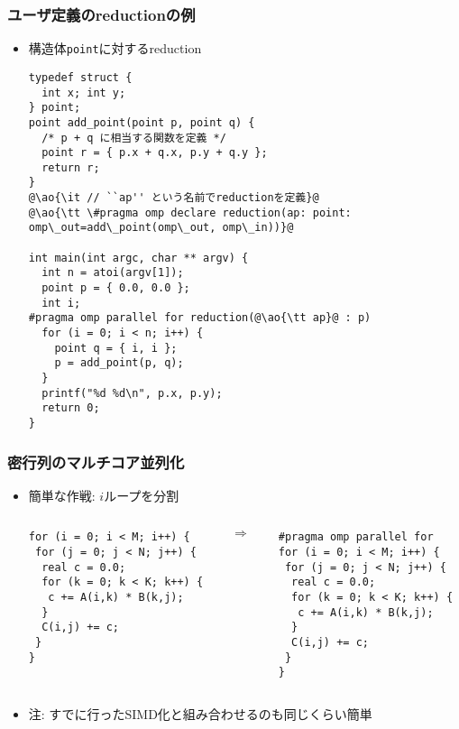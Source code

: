 \documentclass[10pt,dvipdfmx]{beamer}
\newcommand{\ao}[1]{{\color{blue}#1}}
\begin{document}
\begin{frame}[fragile]
\frametitle{ユーザ定義のreductionの例}
\begin{itemize}
\item [] 構造体{\tt point}に対するreduction
\begin{lstlisting}
typedef struct {
  int x; int y;
} point;
point add_point(point p, point q) {
  /* p + q に相当する関数を定義 */
  point r = { p.x + q.x, p.y + q.y };
  return r;
}
@\ao{\it // ``ap'' という名前でreductionを定義}@
@\ao{\tt \#pragma omp declare reduction(ap: point: omp\_out=add\_point(omp\_out, omp\_in))}@

int main(int argc, char ** argv) {
  int n = atoi(argv[1]);
  point p = { 0.0, 0.0 };
  int i;
#pragma omp parallel for reduction(@\ao{\tt ap}@ : p)
  for (i = 0; i < n; i++) {
    point q = { i, i };
    p = add_point(p, q);
  }
  printf("%d %d\n", p.x, p.y);
  return 0;
}
\end{lstlisting}
\end{itemize}
\end{frame}

\begin{frame}[fragile]
\frametitle{密行列のマルチコア並列化}
\begin{itemize}
\item 簡単な作戦: $i$ループを分割
\begin{columns}
\begin{column}{0.45\textwidth}
\begin{lstlisting}
for (i = 0; i < M; i++) {
 for (j = 0; j < N; j++) {
  real c = 0.0;
  for (k = 0; k < K; k++) {
   c += A(i,k) * B(k,j);
  }
  C(i,j) += c;
 }
}
\end{lstlisting}
\end{column}
\begin{column}{0.1\textwidth}
$\Rightarrow$
\end{column}
\begin{column}{0.45\textwidth}
\begin{lstlisting}
#pragma omp parallel for
for (i = 0; i < M; i++) {
 for (j = 0; j < N; j++) {
  real c = 0.0;
  for (k = 0; k < K; k++) {
   c += A(i,k) * B(k,j);
  }
  C(i,j) += c;
 }
}
\end{lstlisting}
\end{column}
\end{columns}
\item [] 注: すでに行ったSIMD化と組み合わせるのも同じくらい簡単
\end{itemize}
\end{frame}
\end{document}
